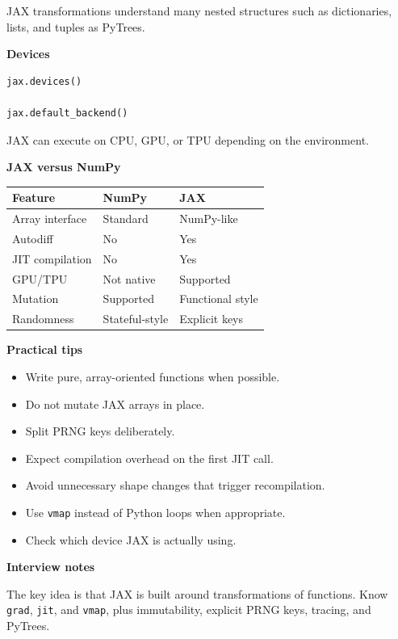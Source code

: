 \documentclass[11pt,letterpaper]{article}
\begin{document}
JAX transformations understand many nested structures such as dictionaries,
lists, and tuples as PyTrees.

\textbf{Devices}

\begin{lstlisting}[language=Python]
jax.devices()

jax.default_backend()
\end{lstlisting}

JAX can execute on CPU, GPU, or TPU depending on the environment.

\textbf{JAX versus NumPy}

\begin{center}
\begin{tabularx}{\textwidth}{lXX}
\toprule
Feature & NumPy & JAX \\
\midrule
Array interface & Standard & NumPy-like \\
Autodiff & No & Yes \\
JIT compilation & No & Yes \\
GPU/TPU & Not native & Supported \\
Mutation & Supported & Functional style \\
Randomness & Stateful-style & Explicit keys \\
\bottomrule
\end{tabularx}
\end{center}

\textbf{Practical tips}

\begin{itemize}[leftmargin=*]
    \item Write pure, array-oriented functions when possible.
    \item Do not mutate JAX arrays in place.
    \item Split PRNG keys deliberately.
    \item Expect compilation overhead on the first JIT call.
    \item Avoid unnecessary shape changes that trigger recompilation.
    \item Use \texttt{vmap} instead of Python loops when appropriate.
    \item Check which device JAX is actually using.
\end{itemize}

\textbf{Interview notes}

The key idea is that JAX is built around transformations of functions. Know
\texttt{grad}, \texttt{jit}, and \texttt{vmap}, plus immutability, explicit
PRNG keys, tracing, and PyTrees.
\end{document}
